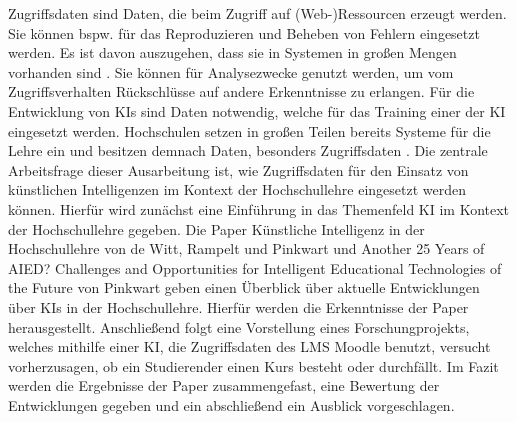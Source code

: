 \noindent
Zugriffsdaten sind Daten, die beim Zugriff auf (Web-)Ressourcen erzeugt werden.
Sie können bspw. für das Reproduzieren und Beheben von Fehlern eingesetzt werden.
Es ist davon auszugehen, dass sie in Systemen in großen Mengen vorhanden sind \cite[S. 3]{Quinn.2020}.
Sie können für Analysezwecke genutzt werden, um vom Zugriffsverhalten Rückschlüsse auf andere Erkenntnisse zu erlangen.
\noindent
Für die Entwicklung von KIs sind Daten notwendig, welche für das Training einer der KI eingesetzt werden.
Hochschulen setzen in großen Teilen bereits Systeme für die Lehre ein und besitzen demnach Daten, besonders Zugriffsdaten \cite[S. 3]{Quinn.2020}.
Die zentrale Arbeitsfrage dieser Ausarbeitung ist, wie Zugriffsdaten für den Einsatz von künstlichen Intelligenzen im Kontext der Hochschullehre eingesetzt werden können.
\noindent
Hierfür wird zunächst eine Einführung in das Themenfeld KI im Kontext der Hochschullehre gegeben.
Die Paper \glqq Künstliche Intelligenz in der Hochschullehre\grqq{} von de Witt, Rampelt und Pinkwart und \glqq Another 25 Years of AIED? Challenges and Opportunities for Intelligent Educational Technologies of the Future\grqq{} von Pinkwart geben einen Überblick über aktuelle Entwicklungen über KIs in der Hochschullehre.
Hierfür werden die Erkenntnisse der Paper herausgestellt.
Anschließend folgt eine Vorstellung eines Forschungprojekts, welches mithilfe einer KI, die Zugriffsdaten des \ac{LMS} Moodle benutzt, versucht vorherzusagen, ob ein Studierender einen Kurs besteht oder durchfällt.
Im Fazit werden die Ergebnisse der Paper zusammengefast, eine Bewertung der Entwicklungen gegeben und ein abschließend ein Ausblick vorgeschlagen.